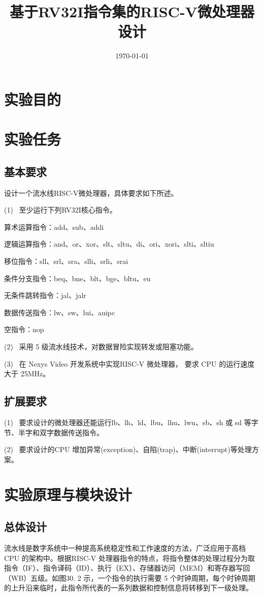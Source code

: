 \documentclass{../source/Experiment}
\title{基于RV32I指令集的RISC-V微处理器设计}
\date{\today}
\begin{document}
    \makecover
    \makeheader
    \section{实验目的}
    
    \section{实验任务}
        \subsection{基本要求}
        设计一个流水线RISC-V微处理器，具体要求如下所述。

        (1) \, 至少运行下列RV32I核心指令。

        算术运算指令：add、sub、addi

        逻辑运算指令：and、or、xor、slt、sltu、di、ori、xori、slti、sltiu

        移位指令：sll、srl、sra、slli、srli、srai

        条件分支指令：beq、bne、blt、bge、bltu、eu

        无条件跳转指令：jal、jalr

        数据传送指令：lw、sw、lui、auipc
    
        空指令：nop

        (2) \, 采用 5 级流水线技术，对数据冒险实现转发或阻塞功能。

        (3) \, 在 Nexys Video 开发系统中实现RISC-V 微处理器， 要求 CPU 的运行速度大于 25MHz。
        \subsection{扩展要求}
        (1) \, 要求设计的微处理器还能运行lb、lh、ld、lbu、lhu、lwu、sb、sh 或 sd 等字节、半字和双字数据传送指令。

        (2) \, 要求设计的CPU 增加异常(exception)、自陷(trap)、中断(interrupt)等处理方案。
        
    \section{实验原理与模块设计}
        \subsection{总体设计}
        流水线是数字系统中一种提高系统稳定性和工作速度的方法，广泛应用于高档CPU 的架构中。根据RISC-V 处理器指令的特点，将指令整体的处理过程分为取指令（IF）、指令译码（ID）、执行（EX）、存储器访问（MEM）和寄存器写回（WB）五级。如图30. 2 示，一个指令的执行需要 5 个时钟周期，每个时钟周期的上升沿来临时，此指令所代表的一系列数据和控制信息将转移到下一级处理。
\end{document}
